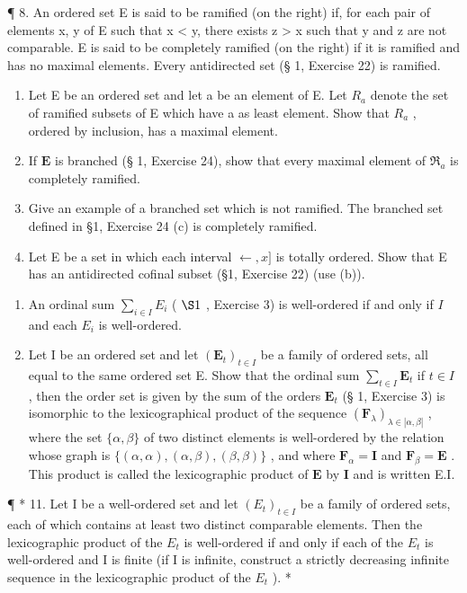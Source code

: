 ¶ 8. An ordered set E is said to be ramified (on the right) if, for each pair of elements x, y of E such that x \textless{} y, there exists z \textgreater{} x such that y and z are not comparable. E is said to be completely ramified (on the right) if it is ramified and has no maximal elements. Every antidirected set (§ 1, Exercise 22) is ramified.

\begin{enumerate}
\def\labelenumi{(\alph{enumi})}
\item
  Let E be an ordered set and let a be an element of E. Let \(R_{a}\) denote the set of ramified subsets of E which have a as least element. Show that \(R_{a}\) , ordered by inclusion, has a maximal element.
\item
  If \(\mathbf{E}\) is branched (§ 1, Exercise 24), show that every maximal element of \(\mathfrak{R}_a\) is completely ramified.
\item
  Give an example of a branched set which is not ramified. The branched set defined in §1, Exercise 24 (c) is completely ramified.
\item
  Let E be a set in which each interval \(\leftarrow, x]\) is totally ordered. Show that E has an antidirected cofinal subset (§1, Exercise 22) (use (b)).
\end{enumerate}

\begin{enumerate}
\def\labelenumi{\arabic{enumi}.}
\setcounter{enumi}{8}
\item
  An ordinal sum \(\sum_{i\in I}E_i\) ( \(\S 1\) , Exercise 3) is well-ordered if and only if \(I\) and each \(E_i\) is well-ordered.
\item
  Let I be an ordered set and let \((\mathbf{E}_t)_{t \in I}\) be a family of ordered sets, all equal to the same ordered set E. Show that the ordinal sum \(\sum_{t \in I} \mathbf{E}_t\) if \(t \in I\) , then the order set is given by the sum of the orders \(\mathbf{E}_t\) (§ 1, Exercise 3) is isomorphic to the lexicographical product of the sequence \((\mathbf{F}_{\lambda})_{\lambda \in |\alpha, \beta|}\) , where the set \(\{\alpha, \beta\}\) of two distinct elements is well-ordered by the relation whose graph is \(\{(\alpha, \alpha), (\alpha, \beta), (\beta, \beta)\}\) , and where \(\mathbf{F}_{\alpha} = \mathbf{I}\) and \(\mathbf{F}_{\beta} = \mathbf{E}\) . This product is called the lexicographic product of \(\mathbf{E}\) by \(\mathbf{I}\) and is written E.I.
\end{enumerate}

¶ * 11. Let I be a well-ordered set and let \((E_t)_{t \in I}\) be a family of ordered sets, each of which contains at least two distinct comparable elements. Then the lexicographic product of the \(E_t\) is well-ordered if and only if each of the \(E_t\) is well-ordered and I is finite (if I is infinite, construct a strictly decreasing infinite sequence in the lexicographic product of the \(E_t\) ). *

